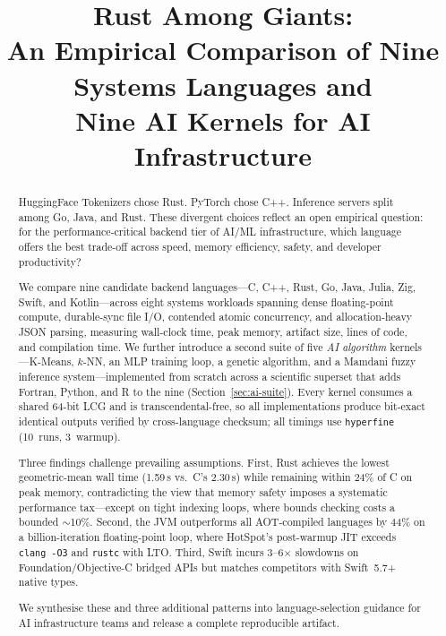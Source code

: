 \documentclass[10pt,conference]{IEEEtran}
\begin{document}
\title{Rust Among Giants:\\ An Empirical Comparison of Nine Systems Languages and\\ Nine AI Kernels for AI Infrastructure}

\author{}

\maketitle

\begin{abstract}
HuggingFace Tokenizers chose Rust. PyTorch chose C++. Inference
servers split among Go, Java, and Rust. These divergent choices
reflect an open empirical question: for the performance-critical
backend tier of AI/ML infrastructure, which language offers the
best trade-off across speed, memory efficiency, safety, and
developer productivity?

We compare nine candidate backend languages---C, C++, Rust, Go,
Java, Julia, Zig, Swift, and Kotlin---across eight systems
workloads spanning dense floating-point compute, durable-sync
file I/O, contended atomic concurrency, and allocation-heavy JSON
parsing, measuring wall-clock time, peak memory, artifact size,
lines of code, and compilation time. We further introduce a second
suite of five \emph{AI algorithm} kernels---K-Means, $k$-NN, an
MLP training loop, a genetic algorithm, and a Mamdani fuzzy
inference system---implemented from scratch across a scientific
superset that adds Fortran, Python, and R to the nine
(Section~\ref{sec:ai-suite}). Every kernel consumes a shared
64-bit LCG and is transcendental-free, so all implementations
produce bit-exact identical outputs verified by cross-language
checksum; all timings use \texttt{hyperfine} (10~runs, 3~warmup).

Three findings challenge prevailing assumptions. First, Rust
achieves the lowest geometric-mean wall time (1.59\,s vs.\ C's
2.30\,s) while remaining within 24\% of C on peak memory,
contradicting the view that memory safety imposes a systematic
performance tax---except on tight indexing loops, where bounds
checking costs a bounded $\sim$10\%. Second, the JVM outperforms
all AOT-compiled languages by 44\% on a billion-iteration
floating-point loop, where HotSpot's post-warmup JIT exceeds
\texttt{clang~-O3} and \texttt{rustc} with LTO. Third, Swift
incurs 3--6$\times$ slowdowns on Foundation/Objective-C bridged
APIs but matches competitors with Swift~5.7+ native types.

We synthesise these and three additional patterns into
language-selection guidance for AI infrastructure teams and
release a complete reproducible artifact.
\end{abstract}
\end{document}
